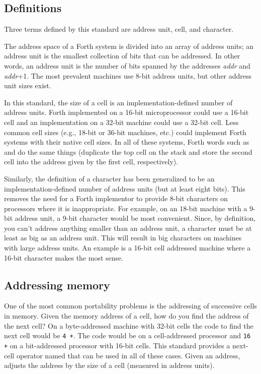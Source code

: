 \subsection{Definitions} %

Three terms defined by this standard are address unit, cell, and
character.

The address space of a Forth system is divided into an array of
address units; an address unit is the smallest collection of bits that
can be addressed. In other words, an address unit is the number of
bits spanned by the addresses \emph{addr} and \emph{addr}+1.
The most prevalent machines use 8-bit address units, but other
address unit sizes exist.

In this standard, the size of a cell is an implementation-defined
number of address units. Forth implemented on a 16-bit microprocessor
could use a 16-bit cell and an implementation on a 32-bit machine
could use a 32-bit cell. Less common cell sizes (e.g., 18-bit or
36-bit machines, etc.) could implement Forth systems with their native
cell sizes. In all of these systems, Forth words such as 
and \word{!} do the same things (duplicate the top cell on the stack
and store the second cell into the address given by the first cell,
respectively).

Similarly, the definition of a character has been generalized to be
an implementation-defined number of address units (but at least eight
bits). This removes the need for a Forth implementor to provide 8-bit
characters on processors where it is inappropriate. For example, on
an 18-bit machine with a 9-bit address unit, a 9-bit character would
be most convenient. Since, by definition, you can't address anything
smaller than an address unit, a character must be at least as big as
an address unit. This will result in big characters on machines with
large address units. An example is a 16-bit cell addressed machine
where a 16-bit character makes the most sense.

\subsection{Addressing memory} %

One of the most common portability problems is the addressing of 
successive cells in memory. Given the memory address of a cell, how
do you find the address of the next cell? 
On a byte-addressed machine
with 32-bit cells the code to find the next cell would be \texttt{4 +}.
The code would be  on a cell-addressed processor and
\texttt{16 +} on a bit-addressed processor with 16-bit cells.
This standard provides a
next-cell operator named  that can be used in all of these cases.
Given an address,  adjusts the address by the size of a cell
(measured in address units).


